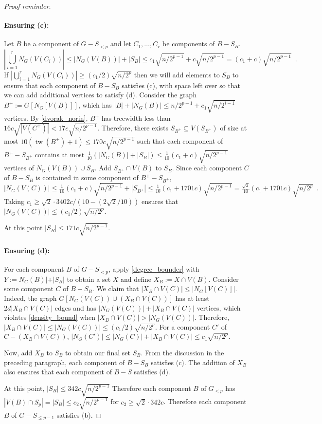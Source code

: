\documentclass{patmorin}
\renewcommand{\ge}{\geqslant}
\renewcommand{\le}{\leqslant}
\DeclareMathOperator{\tw}{tw}
\begin{document}
\begin{proof}[Proof reminder]
  \paragraph{Ensuring (c):}
  Let $B$ be a component of $G-S_{<p}$ and let $C_1,\ldots,C_r$ be components of $B-S_B$.
  \[
      \left|\bigcup_{i=1}^r N_G(V(C_i))\right|\le |N_G(V(B))|+|S_B| \le c_1\sqrt{n/2^{p-1}}+c\sqrt{n/2^{p-1}} = (c_1+c)\sqrt{n/2^{p-1}} \enspace .
  \]
  If $\left|\bigcup_{i=1}^r N_G(V(C_i))\right| \ge (c_1/2)\sqrt{n/2^p}$ then we will add elements to $S_B$ to ensure that each component of $B-S_B$ satisfies (c), with space left over so that we can add additional vertices to satisfy (d).  Consider the graph $B^+:=G[N_G[V(B)]]$, which has $|B|+|N_G(B)|\le n/2^{p-1} + c_1\sqrt{n/2^{i-1}}$ vertices.  By \cref{dvorak_norin}, $B^+$ has treewidth less than $16c\sqrt{|V(C^+)|} < 17c\sqrt{n/2^{p-1}}$.  Therefore, there exists $S_{B^+}\subseteq V(S_{B^+})$ of size at most $10(\tw(B^+)+1)\le 170c\sqrt{n/2^{p-1}}$ such that each component of $B^+-S_{B^+}$ contains at most $\tfrac{1}{10}(|N_G(B)|+|S_B|)\le \tfrac{1}{10}(c_1+c)\sqrt{n/2^{p-1}}$ vertices of $N_G(V(B))\cup S_B$.  Add $S_{B^+}\cap V(B)$ to $S_B$.  Since each component $C$ of $B-S_B$ is contained in some component of $B^+-S_{B^+}$,
  \[
   |N_G(V(C))| \le \tfrac{1}{10}(c_1+c)\sqrt{n/2^{p-1}} + |S_{B^+}|
   \le \tfrac{1}{10}(c_1+1701c)\sqrt{n/2^{p-1}}
   = \tfrac{\sqrt{2}}{10}(c_1+1701c)\sqrt{n/2^{p}} \enspace .
  \]
  Taking $c_1\ge \sqrt{2}\cdot3402c/(10-(2\sqrt{2}/10))$ ensures that $|N_G(V(C))|\le (c_1/2)\sqrt{n/2^p}$.

  At this point $|S_B|\le 171c\sqrt{n/2^{p-1}}$.

  \paragraph{Ensuring (d):}

  For each component $B$ of $G-S_{<p}$, apply \cref{degree_bounder} with $Y:=N_G(B)|+|S_B|$ to obtain a set $X$ and define $X_B:=X\cap V(B)$.  Consider some component $C$ of $B-S_B$.  We claim that $|X_B\cap V(C)|\le |N_G[V(C)]|$.  Indeed, the graph $G[N_G(V(C))\cup (X_B\cap V(C))]$ has at least $2d|X_B\cap V(C)|$ edges and has $|N_G(V(C))|+|X_B\cap V(C)|$ vertices, which violates \cref{density_bound} when $|X_B\cap V(C)|>|N_G(V(C))|$.  Therefore, $|X_B\cap V(C)|\le |N_G(V(C))|\le (c_1/2)\sqrt{n/2^p}$. For a component $C'$ of $C-(X_B\cap V(C))$, $|N_G(C')|\le |N_G(C)|+ |X_B\cap V(C)| \le c_1\sqrt{n/2^p}$.

  Now, add $X_B$ to $S_B$ to obtain our final set $S_B$. From the discussion in the preceding paragraph, each component of $B-S_B$ satisfies (c). The addition of $X_B$ also ensures that each component of $B-S$ satisfies (d).

  At this point, $|S_B| \le 342c\sqrt{n/2^{p-1}}$
  Therefore each component $B$ of $G_{<p}$ has $|V(B)\cap S_p|=|S_B|\le c_2\sqrt{n/2^{p-1}}$ for $c_2\ge \sqrt{2}\cdot 342c$. Therefore each component $B$ of $G-{S_{\le p-1}}$ satisfies (b).
\end{proof}
\end{document}

